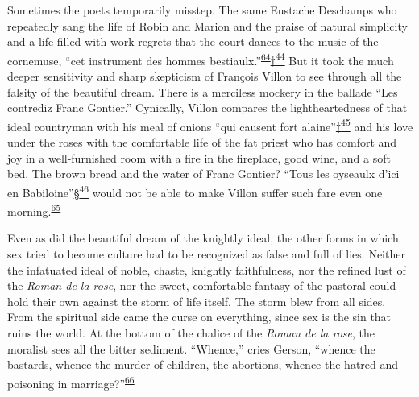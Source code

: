 Sometimes the poets temporarily misstep. The same Eustache Deschamps who
repeatedly sang the life of Robin and Marion and the praise of natural
simplicity and a life filled with work regrets that the court dances to
the music of the cornemuse, ``cet instrument des hommes
bestiaulx.''\textsuperscript{\protect\hypertarget{11_Chapter_Four__THE_FORMS_OF_LOVE.xhtmlux5cux23id_1361}{\protect\hyperlink{23_NOTES.xhtmlux5cux23id_1362}{64}}}\protect\hypertarget{11_Chapter_Four__THE_FORMS_OF_LOVE.xhtmlux5cux23id_2943}{\protect\hyperlink{23_NOTES.xhtmlux5cux23id_2944}{†\textsuperscript{44}}}
But it took the much deeper sensitivity and sharp skepticism of François
Villon to see through all the falsity of the beautiful dream. There is a
merciless mockery in the ballade ``Les contrediz Franc Gontier.''
Cynically, Villon compares the lightheartedness of that ideal countryman
with his meal of onions ``qui causent fort
alaine''\protect\hypertarget{11_Chapter_Four__THE_FORMS_OF_LOVE.xhtmlux5cux23id_2945}{\protect\hyperlink{23_NOTES.xhtmlux5cux23id_2946}{‡\textsuperscript{45}}}
and his love under the roses with the comfortable life of the fat priest
who has comfort and joy in a well-furnished room with a fire in the
fireplace, good wine, and a soft bed. The brown bread and the water of
Franc Gontier? ``Tous les oyseaulx d'ici en
Babiloine''\protect\hypertarget{11_Chapter_Four__THE_FORMS_OF_LOVE.xhtmlux5cux23id_2947}{\protect\hyperlink{23_NOTES.xhtmlux5cux23id_2948}{§\textsuperscript{46}}}
would not be able to make Villon suffer such fare even one
morning.\textsuperscript{\protect\hypertarget{11_Chapter_Four__THE_FORMS_OF_LOVE.xhtmlux5cux23id_1359}{\protect\hyperlink{23_NOTES.xhtmlux5cux23id_1360}{65}}}

Even as did the beautiful dream of the knightly ideal, the other forms
in which sex tried to become culture had to be recognized as false and
full of lies. Neither the infatuated ideal of noble, chaste, knightly
faithfulness, nor the refined lust of the \emph{Roman de la rose}, nor
the sweet, comfortable fantasy of the pastoral could hold their own
against the storm of life itself. The storm blew from all sides. From
the spiritual side came the curse on everything, since sex is the sin
that ruins the world. At the bottom of the chalice of the \emph{Roman de
la rose}, the moralist sees all the bitter sediment. ``Whence,'' cries
Gerson, ``whence the bastards, whence the murder
\protect\hypertarget{11_Chapter_Four__THE_FORMS_OF_LOVE.xhtmlux5cux23page_155}{}{}of
children, the abortions, whence the hatred and poisoning in
marriage?''\textsuperscript{\protect\hypertarget{11_Chapter_Four__THE_FORMS_OF_LOVE.xhtmlux5cux23id_1357}{\protect\hyperlink{23_NOTES.xhtmlux5cux23id_1358}{66}}}

